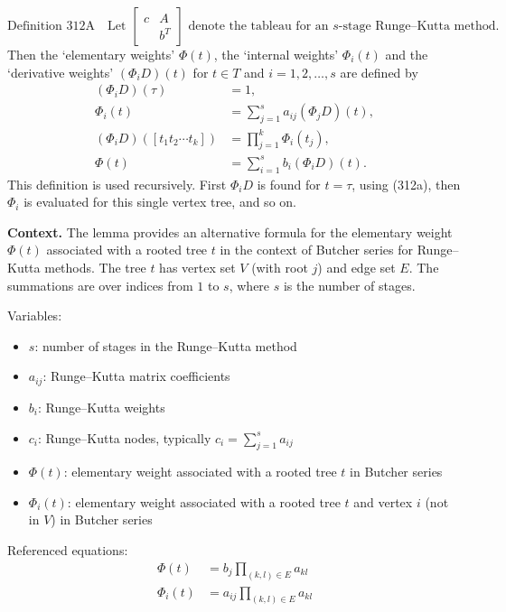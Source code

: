   \label{def:312A}
\[
\text{Definition 312A}\quad\text{Let }
\left[\begin{array}{cc}
c & A \\
& b^T
\end{array}\right]
\text{ denote the tableau for an } s \text{-stage Runge--Kutta method.}
\]
Then the `elementary weights' \(\Phi(t)\), the `internal weights' \(\Phi_i(t)\) and the `derivative weights' \((\Phi_i D)(t)\) for \(t \in T\) and \(i = 1, 2, \dots, s\) are defined by
\[
\begin{aligned}
(\Phi_i D)(\tau) &= 1, \tag{312a}\\
\Phi_i(t) &= \sum_{j=1}^s a_{ij} (\Phi_j D)(t), \tag{312b}\\
(\Phi_i D)([t_1 t_2 \dotsm t_k]) &= \prod_{j=1}^k \Phi_i(t_j), \tag{312c}\\
\Phi(t) &= \sum_{i=1}^s b_i (\Phi_i D)(t). \tag{312d}
\end{aligned}
\]
This definition is used recursively. First \(\Phi_i D\) is found for \(t = \tau\), using (312a), then \(\Phi_i\) is evaluated for this single vertex tree, and so on.

\noindent\textbf{Context.}
The lemma provides an alternative formula for the elementary weight $\Phi(t)$ associated with a rooted tree $t$ in the context of Butcher series for Runge--Kutta methods. The tree $t$ has vertex set $V$ (with root $j$) and edge set $E$. The summations are over indices from $1$ to $s$, where $s$ is the number of stages.

Variables:
\begin{itemize}
    \item $s$: number of stages in the Runge--Kutta method
    \item $a_{ij}$: Runge--Kutta matrix coefficients
    \item $b_i$: Runge--Kutta weights
    \item $c_i$: Runge--Kutta nodes, typically $c_i = \sum_{j=1}^s a_{ij}$
    \item $\Phi(t)$: elementary weight associated with a rooted tree $t$ in Butcher series
    \item $\Phi_i(t)$: elementary weight associated with a rooted tree $t$ and vertex $i$ (not in $V$) in Butcher series
\end{itemize}

Referenced equations:
\begin{align}
    \Phi(t) &= b_j \prod_{(k,l)\in E} a_{kl} \tag{312e}\\
    \Phi_i(t) &= a_{ij} \prod_{(k,l)\in E} a_{kl} \tag{312f}
\end{align}


